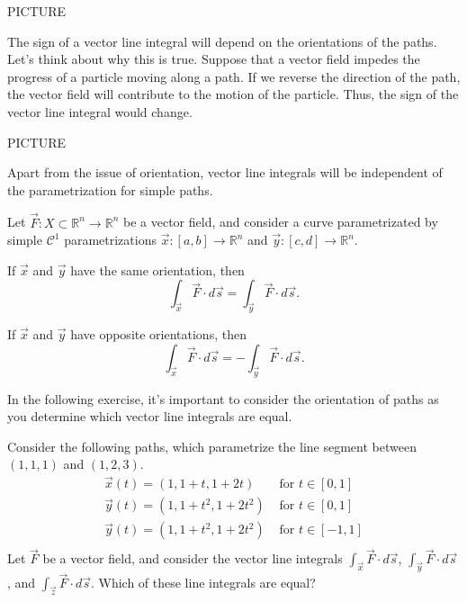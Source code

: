 \documentclass{ximera}
\begin{document}
PICTURE

The sign of a vector line integral will depend on the orientations of the paths. Let's think about why this is true. Suppose that a vector field impedes the progress of a particle moving along a path. If we reverse the direction of the path, the vector field will contribute to the motion of the particle. Thus, the sign of the vector line integral would change.

PICTURE

Apart from the issue of orientation, vector line integrals will be independent of the parametrization for simple paths.

\begin{proposition}
Let $\vec{F}:X\subset\mathbb{R}^n\rightarrow\mathbb{R}^n$ be a vector field, and consider a curve parametrizated by simple $\mathcal{C}^1$ parametrizations $\vec{x}:[a,b]\rightarrow\mathbb{R}^n$ and $\vec{y}:[c,d]\rightarrow\mathbb{R}^n$. 

If $\vec{x}$ and $\vec{y}$ have the same orientation, then
\[
\int_{\vec{x}}\vec{F}\cdot d\vec{s} = \int_{\vec{y}}\vec{F}\cdot d\vec{s}.
\]

If $\vec{x}$ and $\vec{y}$ have opposite orientations, then
\[
\int_{\vec{x}}\vec{F}\cdot d\vec{s} = -\int_{\vec{y}}\vec{F}\cdot d\vec{s}.
\]
\end{proposition}

In the following exercise, it's important to consider the orientation of paths as you determine which vector line integrals are equal.

\begin{problem}
Consider the following paths, which parametrize the line segment between $(1,1,1)$ and $(1,2,3)$.
\begin{align*}
\vec{x}(t) = (1, 1+t, 1+2t) &\text{ for }t\in [0,1]\\
\vec{y}(t) = (1, 1+t^2, 1+2t^2) &\text{ for }t\in [0,1]\\
\vec{y}(t) = (1, 1+t^2, 1+2t^2) &\text{ for }t\in [-1,1]\\
\end{align*}
Let $\vec{F}$ be a vector field, and consider the vector line integrals $\int_{\vec{x}}\vec{F}\cdot d\vec{s}$, $\int_{\vec{y}}\vec{F}\cdot d\vec{s}$, and $\int_{\vec{z}}\vec{F}\cdot d\vec{s}$. Which of these line integrals are equal?
\begin{multipleChoice}
\end{multipleChoice}
\end{problem}
\end{document}
